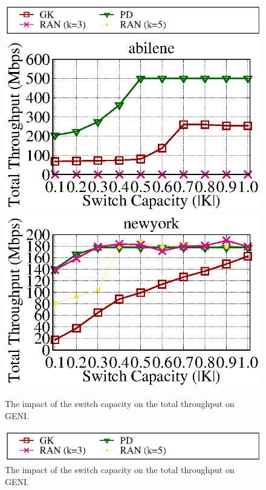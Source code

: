 \documentclass[a4paper,12pt]{report}
\begin{document}
\begin{CJK*}{UTF8}{bkai}
\begin{large}
    \begin{figure}[ht]
    \caption{The impact of the switch capacity on the total throughput on GENI.}
	\centering
	  \includegraphics[width=1.0\textwidth]{lambda_legend.eps}
	  \includegraphics[width=1.0\textwidth]{abilene_geni_throughput_e05.eps}
	  \includegraphics[width=1.0\textwidth]{newyork_geni_throughput_e05.eps}
  \end{figure}
    \begin{figure}[ht]
    \caption{The impact of the switch capacity on the total throughput on GENI.}
	\centering
	  \includegraphics[width=1.0\textwidth]{lambda_legend.eps}

\end{figure}
\end{large}
\end{CJK*}
\end{document}
